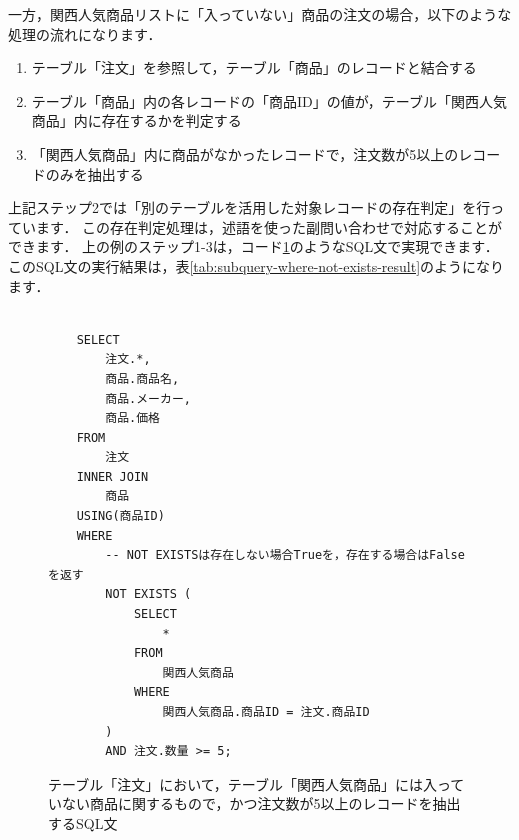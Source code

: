 一方，関西人気商品リストに「入っていない」商品の注文の場合，以下のような処理の流れになります．
\begin{enumerate}
\item テーブル「注文」を参照して，テーブル「商品」のレコードと結合する
\item テーブル「商品」内の各レコードの「商品ID」の値が，テーブル「関西人気商品」内に存在するかを判定する
\item 「関西人気商品」内に商品がなかったレコードで，注文数が5以上のレコードのみを抽出する
\end{enumerate}
上記ステップ2では「別のテーブルを活用した対象レコードの存在判定」を行っています．
この存在判定処理は，述語を使った副問い合わせで対応することができます．
上の例のステップ1-3は，コード\ref{code:subquery-where-not-exists}のようなSQL文で実現できます．
このSQL文の実行結果は，表\ref{tab:subquery-where-not-exists-result}のようになります．
\begin{figure}[!htbp]
    \begin{verbatim}

    SELECT
        注文.*,
        商品.商品名,
        商品.メーカー,
        商品.価格
    FROM
        注文
    INNER JOIN
        商品
    USING(商品ID)
    WHERE
        -- NOT EXISTSは存在しない場合Trueを，存在する場合はFalseを返す
        NOT EXISTS (
            SELECT
                *
            FROM
                関西人気商品
            WHERE
                関西人気商品.商品ID = 注文.商品ID
        )
        AND 注文.数量 >= 5;

    \end{verbatim}
    \captionsetup{name=コード}
    \caption{テーブル「注文」において，テーブル「関西人気商品」には入っていない商品に関するもので，かつ注文数が5以上のレコードを抽出するSQL文}
    \label{code:subquery-where-not-exists}
\end{figure}
